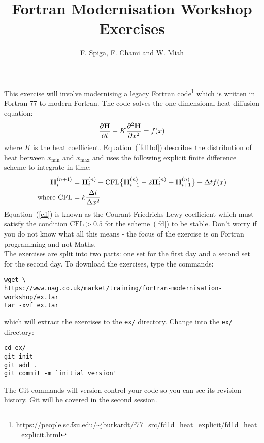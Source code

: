 \documentclass[12pt]{article}
\begin{document}
 
 
 
\title{\bf Fortran Modernisation Workshop \\ Exercises}%
\author{F. Spiga, F. Chami and W. Miah}
 
\maketitle

This exercise will involve modernising a legacy Fortran code\footnote{\url{https://people.sc.fsu.edu/~jburkardt/f77_src/fd1d_heat_explicit/fd1d_heat_explicit.html}} which is written 
in Fortran 77 to modern Fortran. The code solves the one dimensional heat
diffusion equation:
\begin{equation} \label{fd1hd}
\frac{\partial{\bf H}}{\partial t} - K\frac{\partial^{2}{\bf H}}{\partial x^{2}} = f(x)
\end{equation}
where $K$ is the heat coefficient. Equation~(\ref{fd1hd}) describes the distribution of heat 
between $x_{\text{min}}$ and $x_{\text{max}}$ and uses the following explicit finite difference 
scheme to integrate in time:
\begin{align}
{\bf H}^{(n+1)}_{i} & = {\bf H}^{(n)}_{i} + \text{CFL}\big\{{\bf H}^{(n)}_{i-1}-2{\bf H}^{(n)}_{i} +
                      {\bf H}^{(n)}_{i+1}\big\} + \Delta t f(x) \label{fd} \\
            \text{where CFL} & = k\frac{\Delta t}{\Delta x^{2}} \label{cfl}
\end{align}
Equation~(\ref{cfl}) is known as the Courant-Friedrichs-Lewy coefficient which must satisfy
the condition $\text{CFL} > 0.5$ for the scheme~(\ref{fd}) to be stable. Don't worry if you do 
not know what all this means - the focus of the exercise is on Fortran programming and not
Maths. \\

The exercises are split into two parts: one set for the first day and a second
set for the second day. To download the exercises, type the commands:
\begin{verbatim}
wget \
https://www.nag.co.uk/market/training/fortran-modernisation-workshop/ex.tar
tar -xvf ex.tar
\end{verbatim}
which will extract the exercises to the \texttt{ex/} directory. Change into the 
\texttt{ex/} directory:
\begin{verbatim}
cd ex/
git init
git add .
git commit -m `initial version'
\end{verbatim}
The Git commands will version control your code so you can see its revision history. Git will
be covered in the second session. 
\newpage
\end{document}
